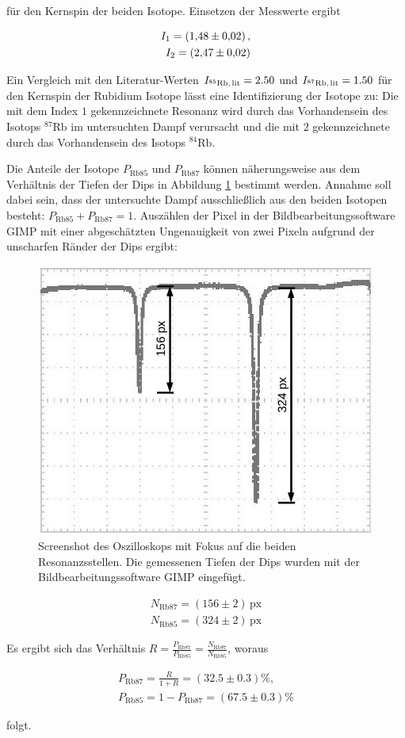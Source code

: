 für den Kernspin der beiden Isotope. Einsetzen der Messwerte ergibt

\begin{eqnarray}
	I_1 = \SI{1.48 \pm 0.02},\\
	I_2 = \SI{2.47 \pm 0.02}.
\end{eqnarray}

Ein Vergleich mit den Literatur-Werten $I_{{}^{85}\text{Rb,\,lit}} = 2.50$ und $I_{{}^{87}\text{Rb,\,lit}} = 1.50$ \cite{Rb} für den Kernspin der Rubidium Isotope lässt eine Identifizierung der Isotope zu: Die mit dem Index $1$ gekennzeichnete Resonanz wird durch das Vorhandensein des Isotops ${}^{87}\text{Rb}$ im untersuchten Dampf verursacht und die mit $2$ gekennzeichnete durch das Vorhandensein des Isotops ${}^{84}\text{Rb}$.

Die Anteile der Isotope $P_{\text{Rb}85}$ und $P_{\text{Rb}87}$ können näherungsweise aus dem Verhältnis der Tiefen der Dips in Abbildung \ref{fig:oszi2_3} bestimmt werden. Annahme soll dabei sein, dass der untersuchte Dampf ausschließlich aus den beiden Isotopen besteht: $P_{\text{Rb}85} + P_{\text{Rb}87} = 1$. Auszählen der Pixel in der Bildbearbeitungssoftware GIMP \cite{Gimp} mit einer abgeschätzten Ungenauigkeit von zwei Pixeln aufgrund der unscharfen Ränder der Dips ergibt:


\begin{figure}
	\centering
	\includegraphics[width=0.7\linewidth]{img/oszi2_3}
	\caption{Screenshot des Oszilloskops mit Fokus auf die beiden Resonanzsstellen. Die gemessenen Tiefen der Dips wurden mit der Bildbearbeitungssoftware GIMP eingefügt.}
	\label{fig:oszi2_3}
\end{figure}

\begin{eqnarray}
	N_{\text{Rb}87} = (156 \pm 2)\, \text{px}\\
	N_{\text{Rb}85} = (324 \pm 2)\, \text{px}
\end{eqnarray}

Es ergibt sich das Verhältnis $R = \frac{P_{\text{Rb}87}}{P_{\text{Rb}85}} = \frac{N_{\text{Rb}87}}{N_{\text{Rb}85}}$, woraus

\begin{eqnarray}
	P_{\text{Rb}87} = \frac{R}{1 + R} = (32.5 \pm 0.3) \%, \\
	P_{\text{Rb}85} = 1 - P_{\text{Rb}87} = (67.5 \pm 0.3) \%
\end{eqnarray}

folgt.